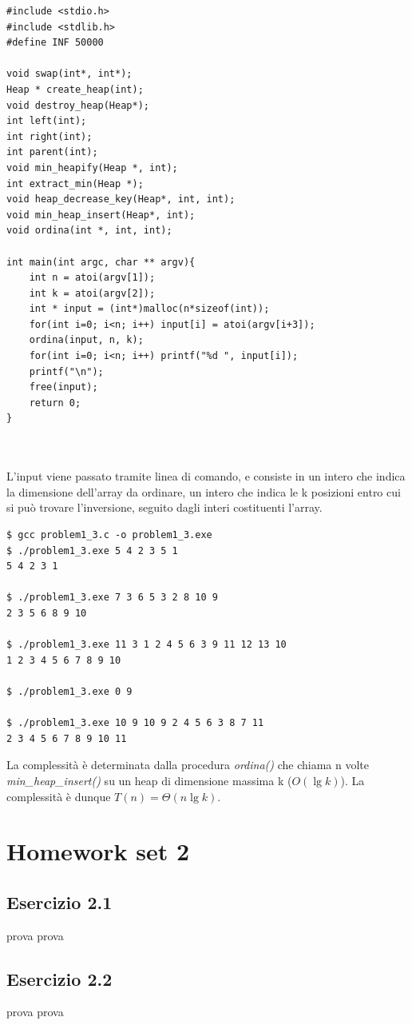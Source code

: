 \documentclass{article}
\begin{document}
\newpage
\begin{lstlisting}
#include <stdio.h>
#include <stdlib.h>
#define INF 50000

void swap(int*, int*);
Heap * create_heap(int);
void destroy_heap(Heap*);
int left(int);
int right(int);
int parent(int);
void min_heapify(Heap *, int);
int extract_min(Heap *);
void heap_decrease_key(Heap*, int, int);
void min_heap_insert(Heap*, int);
void ordina(int *, int, int);

int main(int argc, char ** argv){
    int n = atoi(argv[1]);
    int k = atoi(argv[2]);
    int * input = (int*)malloc(n*sizeof(int)); 
    for(int i=0; i<n; i++) input[i] = atoi(argv[i+3]);
    ordina(input, n, k);
    for(int i=0; i<n; i++) printf("%d ", input[i]);
    printf("\n");
    free(input);
    return 0;
}



\end{lstlisting}
\noindent
L'input viene passato tramite linea di comando, e consiste in un intero che indica la dimensione dell'array da ordinare, un intero che indica le k posizioni entro cui si può trovare l'inversione, seguito dagli interi costituenti l'array. 



\begin{commandline}
\begin{verbatim}
$ gcc problem1_3.c -o problem1_3.exe
$ ./problem1_3.exe 5 4 2 3 5 1 
5 4 2 3 1

$ ./problem1_3.exe 7 3 6 5 3 2 8 10 9 
2 3 5 6 8 9 10

$ ./problem1_3.exe 11 3 1 2 4 5 6 3 9 11 12 13 10 
1 2 3 4 5 6 7 8 9 10

$ ./problem1_3.exe 0 9

$ ./problem1_3.exe 10 9 10 9 2 4 5 6 3 8 7 11
2 3 4 5 6 7 8 9 10 11
\end{verbatim}
\end{commandline}

\noindent
La complessità è determinata dalla procedura \textit{ordina()} che chiama n volte \textit{min\_heap\_insert()} su un heap di dimensione massima k ($O(\lg{k})$). La complessità è dunque $T(n) = \Theta(n\lg{k})$.




\section{Homework set 2} \label{sec:homework_2}%
\subsection{Esercizio 2.1} \label{subsec:esercizio2_1}
prova prova
\subsection{Esercizio 2.2} \label{subsec:esercizio2_2}
prova prova
\end{document}
